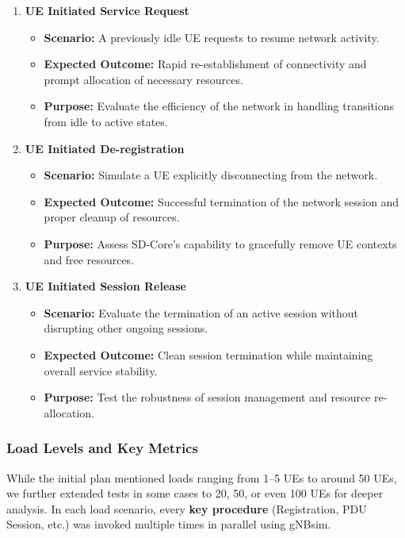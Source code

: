 \begin{enumerate}
    \item \textbf{UE Initiated Service Request}
    \begin{itemize}
        \item \textbf{Scenario:} A previously idle UE requests to resume network activity.
        \item \textbf{Expected Outcome:} Rapid re-establishment of connectivity and prompt allocation of necessary resources.
        \item \textbf{Purpose:} Evaluate the efficiency of the network in handling transitions from idle to active states.
    \end{itemize}

    \item \textbf{UE Initiated De-registration}
    \begin{itemize}
        \item \textbf{Scenario:} Simulate a UE explicitly disconnecting from the network.
        \item \textbf{Expected Outcome:} Successful termination of the network session and proper cleanup of resources.
        \item \textbf{Purpose:} Assess SD-Core's capability to gracefully remove UE contexts and free resources.
    \end{itemize}

    \item \textbf{UE Initiated Session Release}
    \begin{itemize}
        \item \textbf{Scenario:} Evaluate the termination of an active session without disrupting other ongoing sessions.
        \item \textbf{Expected Outcome:} Clean session termination while maintaining overall service stability.
        \item \textbf{Purpose:} Test the robustness of session management and resource re-allocation.
    \end{itemize}
\end{enumerate}

\subsubsection{Load Levels and Key Metrics}
\label{subsec:load-metrics}

While the initial plan mentioned loads ranging from 1--5 UEs to around 50 UEs, we further extended tests in some cases to 20, 50, or even 100 UEs for deeper analysis. In each load scenario, every \textbf{key procedure} (Registration, PDU Session, etc.) was invoked multiple times in parallel using gNBsim.

